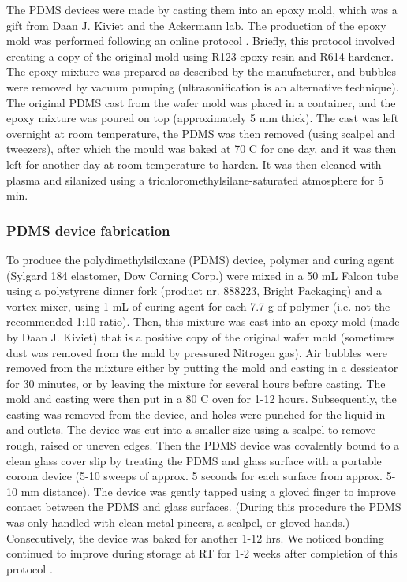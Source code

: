 The PDMS devices were made by casting them into an epoxy mold, which was a gift from Daan J. Kiviet and the Ackermann lab. 
The production of the epoxy mold was performed following an online protocol \cite{EstevezTorres2009}. 
Briefly, this protocol involved creating a copy of the original mold using R123 epoxy resin and R614 hardener. 
The epoxy mixture was prepared as described by the manufacturer, and bubbles were removed by vacuum pumping (ultrasonification is an alternative technique).
The original PDMS cast from the wafer mold was placed in a container, and the epoxy mixture was poured on top (approximately 5 mm thick).
The cast was left overnight at room temperature, the PDMS was then removed (using scalpel and tweezers), after which the mould was baked at 70 C for one day, and it was then left for another day at room temperature to harden.
It was then cleaned with plasma and silanized using a trichloromethylsilane-saturated atmosphere for 5 min.

\subsubsection{PDMS device fabrication}

To produce the polydimethylsiloxane (PDMS) device, polymer and curing agent (Sylgard 184 elastomer, Dow Corning Corp.) were mixed in a 50 mL Falcon tube using a polystyrene dinner fork (product nr. 888223, Bright Packaging) and a vortex mixer, using 1 mL of curing agent for each 7.7 g of polymer (i.e. not the recommended 1:10 ratio).
Then, this mixture was cast into an epoxy mold (made by Daan J. Kiviet) that is a positive copy of the original wafer mold (sometimes dust was removed from the mold by pressured Nitrogen gas).
Air bubbles were removed from the mixture either by putting the mold and casting in a dessicator for 30 minutes, or by leaving the mixture for several hours before casting.
The mold and casting were then put in a 80 C oven for 1-12 hours. 
Subsequently, the casting was removed from the device, and holes were punched for the liquid in- and outlets.
The device was cut into a smaller size using a scalpel to remove rough, raised or uneven edges.
Then the PDMS device was covalently bound to a clean glass cover slip by treating the PDMS and glass surface with a portable corona device \cite{Haubert2006} (5-10 sweeps of approx. 5 seconds for each surface from approx. 5-10 mm distance).
The device was gently tapped using a gloved finger to improve contact between the PDMS and glass surfaces.
(During this procedure the PDMS was only handled with clean metal pincers, a scalpel, or gloved hands.)
Consecutively, the device was baked for another 1-12 hrs. We noticed bonding continued to improve during storage at RT for 1-2 weeks after completion of this protocol .

